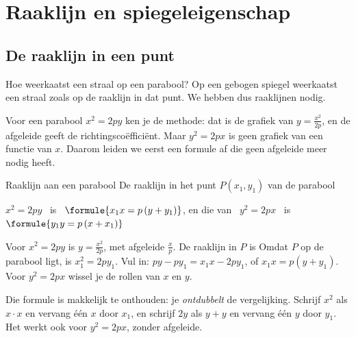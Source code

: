 
\begin{oefeningen}
\end{oefeningen}

\section{Raaklijn en spiegeleigenschap}

\subsection{De raaklijn in een punt}

Hoe weerkaatst een straal op een parabool? Op een gebogen spiegel weerkaatst een straal zoals op de raaklijn in dat punt. We hebben dus raaklijnen nodig.

Voor een parabool $x^2 = 2py$ ken je de methode: dat is de grafiek van $y = \tfrac{x^2}{2p}$, en de afgeleide geeft de richtingscoëfficiënt. Maar $y^2 = 2px$ is geen grafiek van een functie van $x$. Daarom leiden we eerst een formule af die geen afgeleide meer nodig heeft.

\begin{theorie}
\begin{stelling}{Raaklijn aan een parabool}
De raaklijn in het punt $P(x_1, y_1)$ van de parabool

\vspace{1mm}
\qquad $x^2 = 2py$ \ is \ $\formule{x_1 x = p\,(y + y_1)}$, \qquad en die van \ $y^2 = 2px$ \ is \ $\formule{y_1 y = p\,(x + x_1)}$
\end{stelling}

\begin{bewijs}
Voor $x^2 = 2py$ is $y = \tfrac{x^2}{2p}$, met afgeleide $\tfrac{x}{p}$. De raaklijn in $P$ is
Omdat $P$ op de parabool ligt, is $x_1^2 = 2py_1$. Vul in: $py - py_1 = x_1 x - 2py_1$, of $x_1 x = p(y + y_1)$. Voor $y^2 = 2px$ wissel je de rollen van $x$ en $y$.
\end{bewijs}
\end{theorie}

Die formule is makkelijk te onthouden: je \emph{ontdubbelt} de vergelijking. Schrijf $x^2$ als $x \cdot x$ en vervang één $x$ door $x_1$, en schrijf $2y$ als $y + y$ en vervang één $y$ door $y_1$. Het werkt ook voor $y^2 = 2px$, zonder afgeleide.

